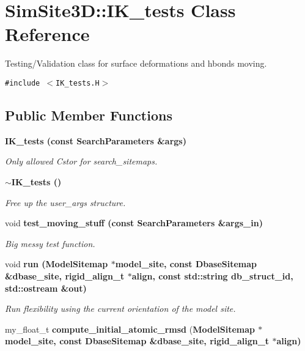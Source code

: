 \section{SimSite3D::IK\_\-tests Class Reference}
\label{classSimSite3D_1_1IK__tests}
Testing/Validation class for surface deformations and hbonds moving.  


{\tt \#include $<$IK\_\-tests.H$>$}

\subsection*{Public Member Functions}
\begin{CompactItemize}
\item 
\bf{IK\_\-tests} (const \bf{Search\-Parameters} \&args)\label{classSimSite3D_1_1IK__tests_89ac913085506be49f734d9d3fbc5d19}

\begin{CompactList}\small\item\em Only allowed Cstor for search\_\-sitemaps. \item\end{CompactList}\item 
\bf{$\sim$IK\_\-tests} ()\label{classSimSite3D_1_1IK__tests_280f1a906f3d73ddd2037c2bbbaf0533}

\begin{CompactList}\small\item\em Free up the user\_\-args structure. \item\end{CompactList}\item 
void \bf{test\_\-moving\_\-stuff} (const \bf{Search\-Parameters} \&args\_\-in)
\begin{CompactList}\small\item\em Big messy test function. \item\end{CompactList}\item 
void \bf{run} (\bf{Model\-Sitemap} $\ast$model\_\-site, const \bf{Dbase\-Sitemap} \&dbase\_\-site, \bf{rigid\_\-align\_\-t} $\ast$align, const std::string db\_\-struct\_\-id, std::ostream \&out)
\begin{CompactList}\small\item\em Run flexibility using the current orientation of the model site. \item\end{CompactList}\item 
my\_\-float\_\-t \textbf{compute\_\-initial\_\-atomic\_\-rmsd} (\bf{Model\-Sitemap} $\ast$model\_\-site, const \bf{Dbase\-Sitemap} \&dbase\_\-site, \bf{rigid\_\-align\_\-t} $\ast$align)\label{classSimSite3D_1_1IK__tests_5748368e2908160b96bcabb654fdcbe6}

\end{CompactItemize}
